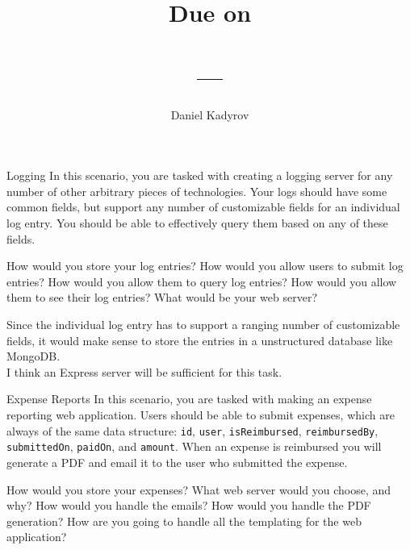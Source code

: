 \documentclass{homework}
\title{
    \Title \\
    \vspace{2mm}
    \large
    Due on \DueDate \\
    \ClassName \\ 
    \ClassNumber ---\ClassSection \\
    \Instructor
}
\author{Daniel Kadyrov}
\date{}
\begin{document}
\maketitle
\thispagestyle{empty}

\begin{problem}[1]{Logging}
    In this scenario, you are tasked with creating a logging server for any number of other arbitrary pieces of technologies. Your logs should have some common fields, but support any number of customizable fields for an individual log entry. You should be able to effectively query them based on any of these fields.

    \vskip 1mm

    How would you store your log entries? How would you allow users to submit log entries? How would you allow them to query log entries? How would you allow them to see their log entries? What would be your web server?
\end{problem}

\begin{solution}
    Since the individual log entry has to support a ranging number of customizable fields, it would make sense to store the entries in a unstructured database like MongoDB. \\

    
    I think an Express server will be sufficient for this task.
\end{solution}

\newpage
\begin{problem}[2]{Expense Reports}
    In this scenario, you are tasked with making an expense reporting web application. Users should be able to submit expenses, which are always of the same data structure: \texttt{id}, \texttt{user}, \texttt{isReimbursed}, \texttt{reimbursedBy}, \texttt{submittedOn}, \texttt{paidOn}, and \texttt{amount}. When an expense is reimbursed you will generate a PDF and email it to the user who submitted the expense. 
    
    \vskip 1mm

    How would you store your expenses? What web server would you choose, and why? How would you handle the emails? How would you handle the PDF generation? How are you going to handle all the templating for the web application?
\end{problem}
\end{document}
